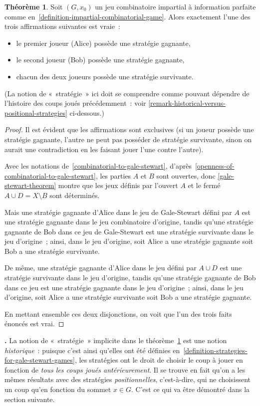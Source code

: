 \documentclass[12pt,a4paper]{article}
\theoremstyle{definition}
\newcommand\thingy{%
\refstepcounter{comcnt}\smallskip\noindent\textbf{\thecomcnt.} }
\newtheorem{thm}[comcnt]{Théorème}
\begin{document}
\begin{thm}\label{determinacy-of-perfect-information-games}
Soit $(G,x_0)$ un jeu combinatoire impartial à information parfaite
comme en \ref{definition-impartial-combinatorial-game}.  Alors
exactement l'une des trois affirmations suivantes est vraie :
\begin{itemize}
\item le premier joueur (Alice) possède une stratégie gagnante,
\item le second joueur (Bob) possède une stratégie gagnante,
\item chacun des deux joueurs possède une stratégie survivante.
\end{itemize}
(La notion de « stratégie » ici doit se comprendre comme pouvant
dépendre de l'histoire des coups joués précédemment : voir
\ref{remark-historical-versus-positional-strategies} ci-dessous.)
\end{thm}
\begin{proof}
Il est évident que les affirmations sont exclusives (si un joueur
possède une stratégie gagnante, l'autre ne peut pas posséder de
stratégie survivante, sinon on aurait une contradiction en les faisant
jouer l'une contre l'autre).

Avec les notations de \ref{combinatorial-to-gale-stewart},
d'après \ref{openness-of-combinatorial-to-gale-stewart}, les parties
$A$ et $B$ sont ouvertes, donc \ref{gale-stewart-theorem} montre que
les jeux définis par l'ouvert $A$ et le fermé $A \cup D = X\setminus
B$ sont déterminés.

Mais une stratégie gagnante d'Alice dans le jeu de Gale-Stewart défini
par $A$ est une stratégie gagnante dans le jeu combinatoire d'origine,
tandis qu'une stratégie gagnante de Bob dans ce jeu de Gale-Stewart
est une stratégie survivante dans le jeu d'origine ; ainsi, dans le
jeu d'origine, soit Alice a une stratégie gagnante soit Bob a une
stratégie survivante.

De même, une stratégie gagnante d'Alice dans le jeu défini par $A \cup
D$ est une stratégie survivante dans le jeu d'origine, tandis qu'une
stratégie gagnante de Bob dans ce jeu est une stratégie gagnante dans
le jeu d'origine ; ainsi, dans le jeu d'origine, soit Alice a une
stratégie survivante soit Bob a une stratégie gagnante.

En mettant ensemble ces deux disjonctions, on voit que l'un des trois
faits énoncés est vrai.
\end{proof}

\thingy\label{remark-historical-versus-positional-strategies} La
notion de « stratégie » implicite dans le
théorème \ref{determinacy-of-perfect-information-games} est une notion
\emph{historique} : puisque c'est ainsi qu'elles ont été définies
en \ref{definition-strategies-for-gale-stewart-games}, les stratégies
ont le droit de choisir le coup à jouer en fonction de \emph{tous les
  coups joués antérieurement}.  Il se trouve en fait qu'on a les mêmes
résultats avec des stratégies \emph{positionnelles}, c'est-à-dire, qui
ne choisissent un coup qu'en fonction du sommet $x \in G$.  C'est ce
qui va être démontré dans la section suivante.
\end{document}
